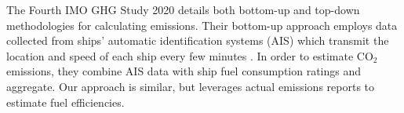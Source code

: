 \documentclass[hidelinks, 12pt,letterpaper]{article}
\begin{document}
 
 
%
%



The Fourth IMO GHG Study 2020 \citep{faber2020fourth} details both bottom-up and top-down methodologies for calculating emissions. Their bottom-up approach employs data collected from ships' automatic identification systems (AIS) which transmit the location and speed of each ship every few minutes \citep[c.f.,][]{jalkanen2009modelling,olmer2017greenhouse,johansson2017global}.
In order to estimate CO$_2$ emissions, they combine AIS data with ship fuel consumption ratings and aggregate. Our approach is similar, but leverages actual emissions reports to estimate fuel efficiencies.
\end{document}
